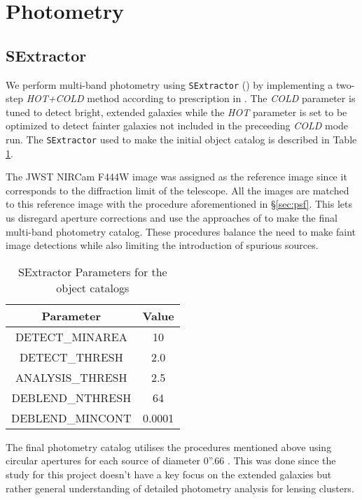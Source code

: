 \documentclass[twocolumn,linenumbers]{aastex631}
\begin{document}
\section{Photometry} \label{sec:photo}

\subsection{SExtractor} \label{sec:se}
We perform multi-band photometry using \texttt{SExtractor} (\cite{1996A&AS..117..393B}) by implementing a two-step \textit{HOT+COLD} method according to prescription in \cite{galametz2013candels}. The \textit{COLD} parameter is tuned to detect bright, extended galaxies while the \textit{HOT} parameter is set to be optimized to detect fainter galaxies not included in the preceeding \textit{COLD} mode run. The \texttt{SExtractor} used to make the initial object catalog is described in Table \ref{tab:params}. 

The JWST NIRCam F444W image was assigned as the reference image since it corresponds to the diffraction limit of the telescope. All the images are matched to this reference image with the procedure aforementioned in \S \ref{sec:psf}. This lets us disregard aperture corrections and use the approaches of \cite{merlin2022early, paris2023glass} to make the final multi-band photometry catalog. These procedures balance the need to make faint image detections while also limiting the introduction of spurious sources.

\begin{table}[h!]
    \centering
    \begin{tabular}{c|c}
        Parameter & Value \\ \hline
        DETECT\_MINAREA & 10 \\
        DETECT\_THRESH & 2.0 \\
        ANALYSIS\_THRESH & 2.5 \\
        DEBLEND\_NTHRESH & 64 \\
        DEBLEND\_MINCONT & 0.0001 \\
    \end{tabular}
    \caption{SExtractor Parameters for the object catalogs}
    \label{tab:params}
\end{table}

The final photometry catalog utilises the procedures mentioned above using circular apertures for each source of diameter 0''.66 . This was done since the study for this project doesn't have a key focus on the extended galaxies but rather general understanding of detailed photometry analysis for lensing clusters. 
\end{document}
